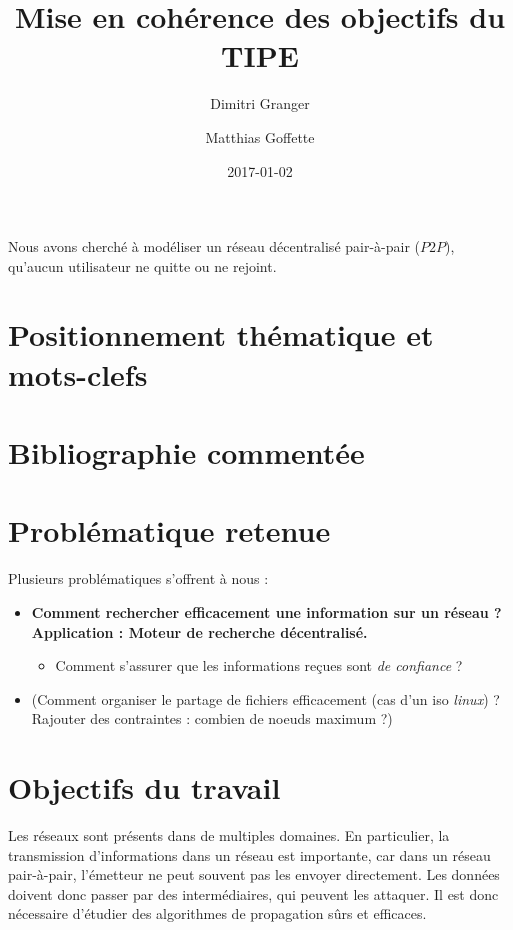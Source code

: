 \documentclass[11pt,a4paper]{article}
\title{Mise en cohérence des objectifs du TIPE}
\date{2017-01-02}
\author{Dimitri Granger \and Matthias Goffette}
\begin{document}

\maketitle

\begin{it}
Nous avons cherché à modéliser un réseau décentralisé pair-à-pair ($P2P$), qu'aucun utilisateur ne quitte ou ne rejoint.
\end{it}

\section{Positionnement thématique et mots-clefs}

\section{Bibliographie commentée}

\section{Problématique retenue}

Plusieurs problématiques s'offrent à nous :
\begin{itemize}

	\item \textbf{Comment rechercher efficacement une information sur un réseau ? Application : Moteur de recherche décentralisé.}
	\begin{itemize}
		\item Comment s'assurer que les informations reçues sont \emph{de confiance} ?
	\end{itemize}
	
	\item (Comment organiser le partage de fichiers efficacement (cas d'un iso \emph{linux}) ? Rajouter des contraintes : combien de noeuds maximum ?)
	
\end{itemize}

\section{Objectifs du travail}

Les réseaux sont présents dans de multiples domaines. En particulier, la transmission d'informations dans un réseau est importante, car dans un réseau pair-à-pair, l'émetteur ne peut souvent pas les envoyer directement. Les données doivent donc passer par des intermédiaires, qui peuvent les attaquer. Il est donc nécessaire d'étudier des algorithmes de propagation sûrs et efficaces.
\end{document}
